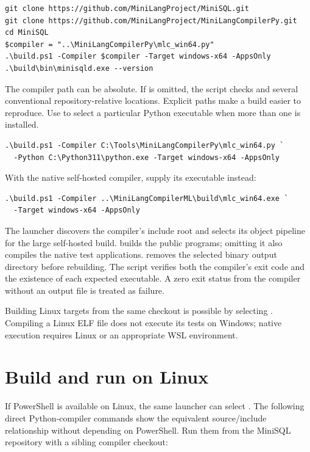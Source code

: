 \begin{lstlisting}
git clone https://github.com/MiniLangProject/MiniSQL.git
git clone https://github.com/MiniLangProject/MiniLangCompilerPy.git
cd MiniSQL
$compiler = "..\MiniLangCompilerPy\mlc_win64.py"
.\build.ps1 -Compiler $compiler -Target windows-x64 -AppsOnly
.\build\bin\minisqld.exe --version
\end{lstlisting}

The compiler path can be absolute. If  is omitted, the script
checks  and several conventional repository-relative
locations. Explicit paths make a build easier to reproduce. Use
 to select a particular Python executable when more than one
is installed.

\begin{lstlisting}
.\build.ps1 -Compiler C:\Tools\MiniLangCompilerPy\mlc_win64.py `
  -Python C:\Python311\python.exe -Target windows-x64 -AppsOnly
\end{lstlisting}

With the native self-hosted compiler, supply its executable instead:

\begin{lstlisting}
.\build.ps1 -Compiler ..\MiniLangCompilerML\build\mlc_win64.exe `
  -Target windows-x64 -AppsOnly
\end{lstlisting}

The launcher discovers the compiler's  include root and selects
its object pipeline for the large self-hosted build.  builds
the public programs; omitting it also compiles the native test applications.
 removes the selected binary output directory before rebuilding.
The script verifies both the compiler's exit code and the existence of each
expected executable. A zero exit status from the compiler without an output
file is treated as failure.

Building Linux targets from the same checkout is possible by selecting
. Compiling a Linux ELF file does not execute its
tests on Windows; native execution requires Linux or an appropriate WSL
environment.

\section{Build and run on Linux}

If PowerShell is available on Linux, the same launcher can select
. The following direct Python-compiler commands show the
equivalent source/include relationship without depending on PowerShell.
Run them from the MiniSQL repository with a sibling compiler checkout:

